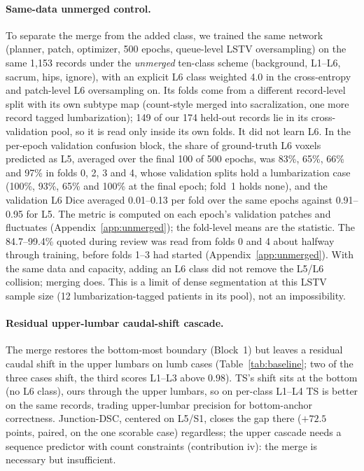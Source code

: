 \documentclass{article}
\newcommand{\sota}{TS}
\begin{document}
\paragraph{Same-data unmerged control.}
\label{sec:unmerged}
To separate the merge from the added class, we trained
the same network (planner, patch, optimizer, 500 epochs,
queue-level LSTV oversampling) on the same 1{,}153
records under the \emph{unmerged} ten-class scheme
(background, L1--L6, sacrum, hips, ignore), with an
explicit L6 class weighted 4.0 in the cross-entropy and
patch-level L6 oversampling on. Its folds come from a different
record-level split with its own subtype map (count-style
merged into sacralization, one more record tagged
lumbarization); 149 of our 174 held-out records lie in its
cross-validation pool, so it is read only inside its own
folds. It did not learn L6. In the per-epoch validation
confusion block, the share of ground-truth L6 voxels
predicted as L5, averaged over the final 100 of 500
epochs, was 83\%, 65\%, 66\% and 97\% in folds 0, 2, 3
and 4, whose validation splits hold a lumbarization case
(100\%, 93\%, 65\% and 100\% at the final epoch; fold~1
holds none), and the validation L6 Dice averaged
0.01--0.13 per fold over the same epochs against
0.91--0.95 for L5. The metric is computed on each
epoch's validation patches and fluctuates
(Appendix~\ref{app:unmerged}); the fold-level means are
the statistic. The 84.7--99.4\%
quoted during review was read from folds 0 and 4 about
halfway through training, before folds 1--3 had started
(Appendix~\ref{app:unmerged}). With the same data and
capacity, adding an L6 class did not remove the L5/L6
collision; merging does. This is a limit of dense
segmentation at this LSTV sample size (12
lumbarization-tagged patients in its pool), not an
impossibility.

\paragraph{Residual upper-lumbar caudal-shift cascade.}
The merge restores the bottom-most boundary (Block~1) but
leaves a residual caudal shift in the upper lumbars on lumb
cases (Table~\ref{tab:baseline}; two of the three cases
shift, the third scores L1--L3 above $0.98$). \sota{}'s
shift sits at the bottom (no L6 class), ours through the
upper lumbars, so on per-class L1--L4 \sota{} is better
on the same records, trading upper-lumbar precision for
bottom-anchor correctness. Junction-DSC, centered on
L5/S1, closes the gap there ($+72.5$ points, paired, on
the one scorable case) regardless; the upper cascade needs
a sequence predictor with count constraints (contribution
iv): the merge is necessary but insufficient.
\end{document}
